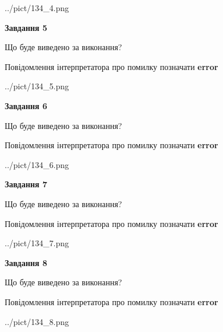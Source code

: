 \documentclass[12pt, ukrainian]{article}
\begin{document}
{\begin{center}
	{../pict/134_4.png}
\end{center}
\newpage

{\begin {center}\textbf{Завдання 5}\end {center}}\par
Що буде виведено за виконання? \par
Повідомлення інтерпретатора про помилку позначати \textbf{error}

\begin{center}
	{../pict/134_5.png}
\end{center}
\newpage

{\begin {center}\textbf{Завдання 6}\end {center}}\par
Що буде виведено за виконання? \par
Повідомлення інтерпретатора про помилку позначати \textbf{error}

\begin{center}
	{../pict/134_6.png}
\end{center}
\newpage

{\begin {center}\textbf{Завдання 7}\end {center}}\par
Що буде виведено за виконання? \par
Повідомлення інтерпретатора про помилку позначати \textbf{error}

\begin{center}
	{../pict/134_7.png}
\end{center}
\newpage

{\begin {center}\textbf{Завдання 8}\end {center}}\par
Що буде виведено за виконання? \par
Повідомлення інтерпретатора про помилку позначати \textbf{error}

\begin{center}
	{../pict/134_8.png}
\end{center}
\newpage

}
\end{document}
